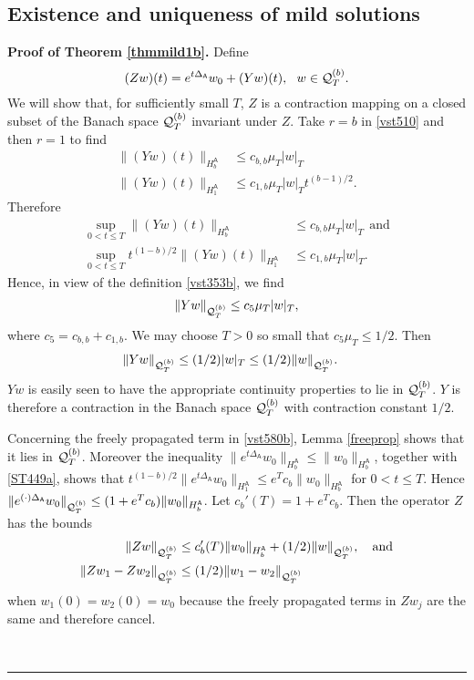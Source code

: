 \documentclass[12pt]{article}
\newenvironment{proof}[1][Proof]{\textbf{#1.} }{\ \rule{0.5em}{0.5em}}
\def \As{\mathsf{A}}
\def \Q{{\cal Q}}
\def \beq{\begin{equation}}
\def \eeq{\end{equation}}
\def \eref{\eqref}
\numberwithin{equation}{section}
\begin{document}
\subsection{Existence and uniqueness of mild solutions} \label{seceum}


\begin{proof}[Proof of Theorem \ref{thmmild1b}]
Define
\beq
(Zw)(t) = e^{t\Delta_\As}w_0 + (Yw)(t),     \ \ w \in \Q_T^{(b)} .  \label{vst580b}
\eeq
We will show that, for sufficiently small $T$,  $Z$ is a contraction mapping on a 
closed subset of the Banach space $\Q_T^{(b)}$ invariant under $Z$. 
Take $r =b$ in \eref{vst510} and then $r=1$ to find
\begin{align}
\|(Yw)(t)\|_{H_b^\As} &\le  c_{b,b} \mu_{T} |w|_T \\
\|(Yw)(t)\|_{H_1^\As} &\le  c_{1,b} \mu_{T} |w|_T t^{(b-1)/2}.
\end{align} 
Therefore
\begin{align}
\sup_{ 0 < t \le T} \| (Yw)(t)\|_{H_b^\As} &\le  c_{b,b} \mu_T |w|_T \ \ \text{and} \\
\sup_{ 0 < t \le T} t^{(1-b)/2} \| (Yw)(t)\|_{H_1^\As} &\le c_{1,b} \mu_T |w|_T.
\end{align}
Hence, in view of the definition \eref{vst353b}, we find
\begin{align}
\|Yw\|_{\Q_T^{(b)}} \le c_5 \mu_T |w|_T,
\end{align}
where $c_5 = c_{b,b} + c_{1,b}$.
We may choose $T>0$ so small that $c_5 \mu_T \le 1/2$.  Then
\begin{align}
\|Yw\|_{\Q_T^{(b)}} &\le (1/2) |w|_T     
\le (1/2)  \|w\|_{\Q_T^{(b)}} .    \label{vst585}
\end{align}
$Yw$ is  easily seen to  have the appropriate continuity properties to lie in $\Q_T^{(b)}$.
 $Y$ is  therefore a contraction in the Banach space $\Q_T^{(b)}$ with contraction constant $1/2$.


Concerning the freely propagated term in \eref{vst580b}, Lemma \ref{freeprop} 
 shows that it lies in $\Q_T^{(b)}$. Moreover the inequality 
 $\|e^{t\Delta_\As} w_0\|_{H_b^\As} \le \| w_0\|_{H_b^\As}$, together with 
\eref{ST449a}, shows that  $t^{(1-b)/2} \| e^{t\Delta_\As} w_0\|_{H_1^\As} \le e^T c_b \|w_0\|_{H_b^\As}$
for $0 < t \le T$. Hence $\|e^{(\cdot)\Delta_\As} w_0\|_{ \Q_T^{(b)}} \le(1 + e^T c_b) \|w_0\|_{H_b^\As}$.
Let $c_b'(T) = 1 + e^T c_b$. Then the operator $Z$ has the bounds 
\begin{align}
\|Zw\|_{ \Q_T^{(b)}}  &\le c_b'(T) \|w_0\|_{H_b^\As} +  (1/2) \|w\|_{ \Q_T^{(b)}} ,\ \ \  \text{and} \label{vst586}\\
\|Zw_1 - Zw_2\|_{ \Q_T^{(b)}}  &\le    (1/2) \|w_1-w_2\|_{ \Q_T^{(b)}}
\end{align}
when  $w_1(0) = w_2(0) = w_0$ because the freely propagated terms in $Zw_j$ are the same
and therefore cancel. 




\end{proof}
\end{document}
